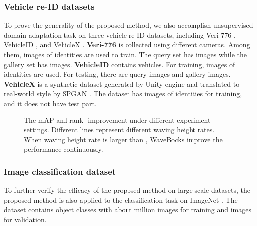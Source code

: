 \documentclass[journal]{IEEEtran}
\begin{document}
\subsubsection{Vehicle re-ID datasets}
To prove the generality of the proposed method, we also accomplish unsupervised domain adaptation task on three vehicle re-ID datasets, including Veri-776  \cite{liu2016deep}, VehicleID \cite{liu_2016deep}, and VehicleX \cite{naphade20204th}. \textbf{Veri-776} \cite{liu2016deep} is collected using  different cameras. Among them,  images of  identities are used to train. The query set has  images while the gallery set has  images. \textbf{VehicleID} \cite{liu_2016deep} contains  vehicles. For training,  images of  identities are used. For testing, there are  query images and  gallery images. \textbf{VehicleX} \cite{naphade20204th} is a synthetic dataset generated by Unity engine \cite{yao2019simulating,tang2019pamtri} and translated to real-world style by SPGAN \cite{deng2018image}. The dataset has  images of  identities for training, and it does not have test part.
\begin{figure*}

\centering



 \caption{The mAP and rank- improvement under different experiment settings. Different lines represent different waving height rates. When waving height rate is larger than ,  WaveBocks improve the performance continuously.} \label{para}

\end{figure*}
\subsubsection{Image classification dataset}
To further verify the efficacy of the proposed method on large scale datasets, the proposed method is also applied to the classification task on ImageNet \cite{deng2009imagenet}. The dataset contains  object classes with about  million images for training and  images for validation.
\end{document}
